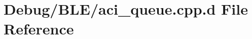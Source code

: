 \hypertarget{_debug_2_b_l_e_2aci__queue_8cpp_8d}{\section{\-Debug/\-B\-L\-E/aci\-\_\-queue.cpp.\-d \-File \-Reference}
\label{_debug_2_b_l_e_2aci__queue_8cpp_8d}
}
